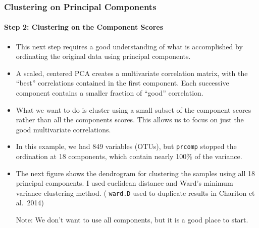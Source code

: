 \documentclass[10pt]{beamer}
\begin{document}
\begin{frame}[fragile]
\frametitle{Clustering on Principal Components}
\framesubtitle{Step 2:  Clustering on the Component Scores}

{\footnotesize
\begin{itemize}

\item This next step requires a good understanding of what is
  accomplished by ordinating the original data using principal
  components.

\vspace{1ex}  
\item A scaled, centered PCA creates a multivariate correlation
  matrix, with the ``best'' correlations contained in the first
  component.  Each successive component contains a smaller fraction
  of ``good'' correlation.

\vspace{1ex}  
\item What we want to do is cluster using a small subset of the
  component scores rather than all the components
  scores. This allows us to focus on just the good multivariate
  correlations.

\vspace{1ex}  
\item In this example, we had 849 variables (OTUs), but {\color{red}
  \tt prcomp} stopped the ordination at 18 components, which contain
  nearly 100\% of the variance.

\vspace{1ex}  
\item The next figure shows the dendrogram for clustering the samples
  using all 18 principal components. I used euclidean distance and
  Ward's minimum variance clustering method. ({\color{red} \tt ward.D} used to duplicate results in Chariton et al.~2014)

\vspace*{1ex}
Note: We don't want to use all components, but it is a
good place to start.

\end{itemize}
}

\end{frame}
\end{document}
